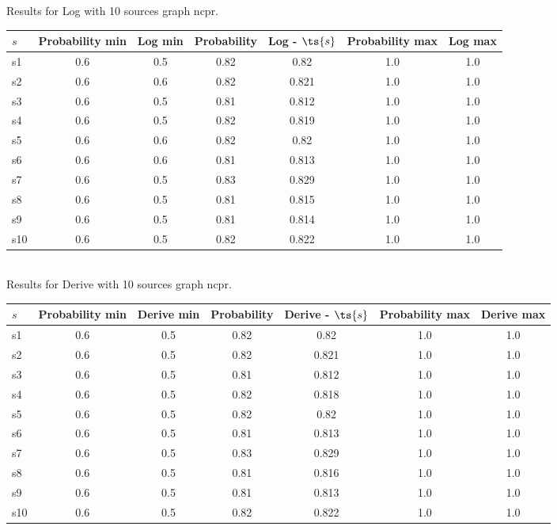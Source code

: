 \documentclass{article}
\begin{document}
\noindent Results for Log with 10 sources graph ncpr.

\noindent\begin{tabular}{|l|c|c|c|c|c|c|}
\hline
$s$& Probability min & Log min & Probability & Log - $\ts{s}$ & Probability max & Log max\\
\hline
s1 &0.6 & 0.5 & 0.82 & 0.82 & 1.0 & 1.0\\
\hline
s2 &0.6 & 0.6 & 0.82 & 0.821 & 1.0 & 1.0\\
\hline
s3 &0.6 & 0.5 & 0.81 & 0.812 & 1.0 & 1.0\\
\hline
s4 &0.6 & 0.5 & 0.82 & 0.819 & 1.0 & 1.0\\
\hline
s5 &0.6 & 0.6 & 0.82 & 0.82 & 1.0 & 1.0\\
\hline
s6 &0.6 & 0.6 & 0.81 & 0.813 & 1.0 & 1.0\\
\hline
s7 &0.6 & 0.5 & 0.83 & 0.829 & 1.0 & 1.0\\
\hline
s8 &0.6 & 0.5 & 0.81 & 0.815 & 1.0 & 1.0\\
\hline
s9 &0.6 & 0.5 & 0.81 & 0.814 & 1.0 & 1.0\\
\hline
s10 &0.6 & 0.5 & 0.82 & 0.822 & 1.0 & 1.0\\
\hline
\end{tabular}\\

\noindent Results for Derive with 10 sources graph ncpr.

\noindent\begin{tabular}{|l|c|c|c|c|c|c|}
\hline
$s$& Probability min & Derive min & Probability & Derive - $\ts{s}$ & Probability max & Derive max\\
\hline
s1 &0.6 & 0.5 & 0.82 & 0.82 & 1.0 & 1.0\\
\hline
s2 &0.6 & 0.5 & 0.82 & 0.821 & 1.0 & 1.0\\
\hline
s3 &0.6 & 0.5 & 0.81 & 0.812 & 1.0 & 1.0\\
\hline
s4 &0.6 & 0.5 & 0.82 & 0.818 & 1.0 & 1.0\\
\hline
s5 &0.6 & 0.5 & 0.82 & 0.82 & 1.0 & 1.0\\
\hline
s6 &0.6 & 0.5 & 0.81 & 0.813 & 1.0 & 1.0\\
\hline
s7 &0.6 & 0.5 & 0.83 & 0.829 & 1.0 & 1.0\\
\hline
s8 &0.6 & 0.5 & 0.81 & 0.816 & 1.0 & 1.0\\
\hline
s9 &0.6 & 0.5 & 0.81 & 0.813 & 1.0 & 1.0\\
\hline
s10 &0.6 & 0.5 & 0.82 & 0.822 & 1.0 & 1.0\\
\hline
\end{tabular}\\
\end{document}
